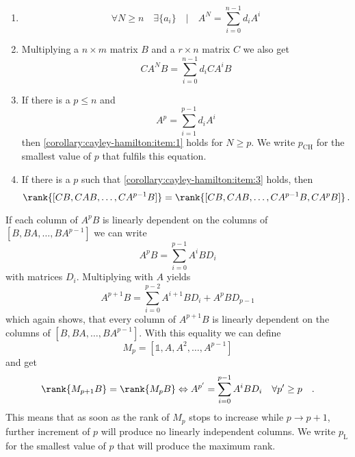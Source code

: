 \begin{corollary}[\ref{theorem:cayley-hamilton}]
\begin{enumerate}
\item  \label{corollary:cayley-hamilton:item:1}
	\begin{equation}
	\forall N\geq n \quad \exists \{a_i\} \quad | \quad 
	A^{N} = \sum\limits_{i=0}^{n-1} d_i A^i  
	\end{equation}
\item Multiplying a $n\times m$ matrix $B$ and a $r\times n$ matrix $C$ we also get 
	\begin{equation}
	C A^N B = \sum\limits_{i=0}^{n-1} d_i C A^i B
	\end{equation}
\item \label{corollary:cayley-hamilton:item:3}
	If there is a $p \leq n$ and
	\begin{equation}
	A^p = \sum\limits_{i=1}^{p-1} d_i A^i 
	\end{equation}
	then \ref{corollary:cayley-hamilton:item:1} holds for $N \geq p$. We write 
	$p_\text{CH}$ for the smallest value of $p$ that fulfils this equation.
\item If there is a $p$ such that \ref{corollary:cayley-hamilton:item:3} holds, then
	\begin{equation}
	\rank{[CB,CAB,\ldots,CA^{p-1}B]} =\rank{[CB,CAB,\ldots,CA^{p-1}B,CA^pB]} \, . 
	\end{equation}
\end{enumerate}
\end{corollary}

\begin{theorem}[Luenberg]
If each column of $A^pB$ is linearly dependent on the columns of $[B,BA,\ldots,BA^{p-1}]$ 
we can write
\begin{equation}
A^p B = \sum\limits_{i=0}^{p-1} A^i B D_i
\end{equation}
with matrices $D_i$. Multiplying with $A$ yields
\begin{equation}
A^{p+1} B = \sum\limits_{i=0}^{p-2} A^{i+1} B D_i + A^p B D_{p-1}
\end{equation}
which again shows, that every column of $A^{p+1}B$ is linearly dependent on the columns of
$[B,BA,\ldots,BA^{p-1}]$. With this equality we can define 
\begin{equation}
M_p = [\mathbb{1},A,A^2,\ldots,A^{p-1}]
\end{equation}
and get
\begin{equation}
\rank{M_{p+1} B} = \rank{M_p B} \Leftrightarrow A^{p'} = \sum\limits_{i=0}^{p-1} A^i B D_i 
\quad \forall p' \geq p \quad .
\end{equation}
This means that as soon as the rank of $M_p$ stops to increase while $p \to p+1$, further 
increment of $p$ will produce no linearly independent columns. We write $p_\text{L}$ for 
the smallest value of $p$ that will produce the maximum rank.
\end{theorem}

